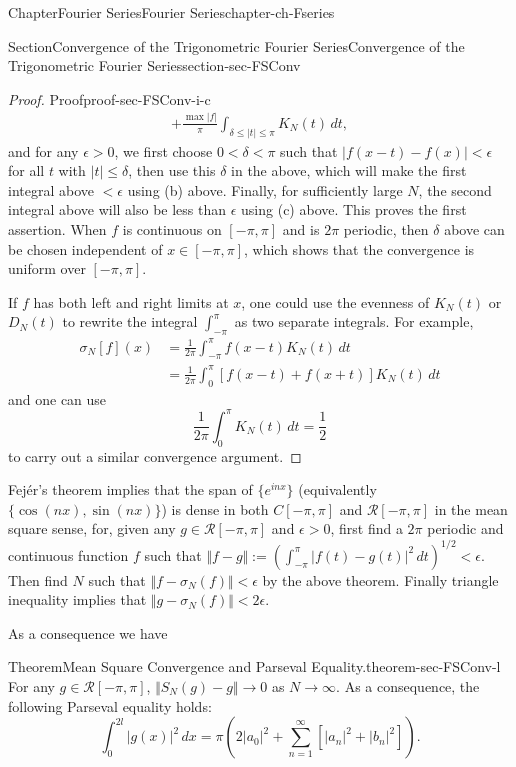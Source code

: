 \documentclass[oneside,10pt,]{book}
\numberwithin{equation}{section}
\newcommand{\cR}{\mathcal{R}}
\newcommand{\lt}{<}
\newcommand{\gt}{>}
\newcommand{\amp}{&}
\begin{document}
\begin{chapterptx}{Chapter}{Fourier Series}{}{Fourier Series}{}{}{chapter-ch-Fseries}
\begin{sectionptx}{Section}{Convergence of the Trigonometric Fourier Series}{}{Convergence of the Trigonometric Fourier Series}{}{}{section-sec-FSConv}
\begin{proof}{Proof}{}{proof-sec-FSConv-i-c}
\begin{align*}
+ \frac{\max |f|}{\pi} \int_{\delta \le |t|\le \pi} K_{N}(t)\, dt,
\end{align*}
and for any \(\epsilon >0\), we first choose \(0 < \delta <\pi\) such that \(|f(x-t) -f(x)| < \epsilon\) for all \(t\) with \(|t|\le \delta\), then use this \(\delta\) in the above, which will make the first integral above \(< \epsilon\) using (b) above. Finally, for sufficiently large \(N\), the second integral above will also be less than \(\epsilon\) using (c) above. This proves the first assertion. When \(f\) is continuous on \([-\pi, \pi]\) and is \(2\pi\) periodic, then \(\delta\) above can be chosen independent of \(x\in [-\pi, \pi]\), which shows that the convergence is uniform over \([-\pi, \pi]\).%
\par
If \(f\) has both left and right limits at \(x\), one could use the evenness of \(K_{N}(t)\) or \(D_{N}(t)\) to rewrite the integral \(\int_{-\pi}^{\pi}\) as two separate integrals. For example,%
\begin{align*}
\sigma_{N}[f](x) \amp= \frac{1}{2\pi} \int_{-\pi}^{\pi}f(x-t) K_{N}(t)\, dt\\
\amp= \frac{1}{2\pi} \int_{0}^{\pi}\left[f(x-t) +f(x+t)\right] K_{N}(t)\, dt 
\end{align*}
and one can use%
\begin{equation*}
\frac{1}{2\pi} \int_{0}^{\pi} K_{N}(t)\, dt=\frac 12
\end{equation*}
to carry out a similar convergence argument.%
\end{proof}
Fejér's theorem implies  that the span of \(\{ e^{i nx}\}\) (equivalently \(\{\cos(nx), \sin(nx)\}\)) is  dense in both \(C[-\pi, \pi]\) and \(\cR[-\pi ,\pi]\) in the mean square sense, for, given any \(g\in \cR[-\pi ,\pi]\) and \(\epsilon \gt 0\), first find a \(2\pi\) periodic and continuous function \(f\) such that \(\Vert f-g\Vert :=\left(\int_{-\pi}^{\pi}|f(t)-g(t)|^{2}\, dt\right)^{1/2}\lt \epsilon\). Then find \(N\) such that \(\Vert f- \sigma_{N}(f)\Vert \lt \epsilon\) by the above theorem. Finally triangle inequality implies that \(\Vert g- \sigma_{N}(f)\Vert \lt 2\epsilon\).%
\par
As a consequence we have%
\begin{theorem}{Theorem}{Mean Square Convergence and Parseval Equality.}{}{theorem-sec-FSConv-l}%
For any \(g\in \cR[-\pi ,\pi]\), \(\Vert S_{N}(g)-g\Vert\to 0\) as \(N\to \infty\). As a consequence, the following Parseval equality holds:%
\begin{equation*}
\int_{0}^{2l} |g(x)|^{2}\, dx = \pi\left( 2 |a_{0}|^{2}+ \sum_{n=1}^{\infty} \left[ |a_{n}|^{2}+|b_{n}|^{2}\right]\right).

\end{equation*}
\end{theorem}
\end{sectionptx}
\end{chapterptx}
\end{document}
